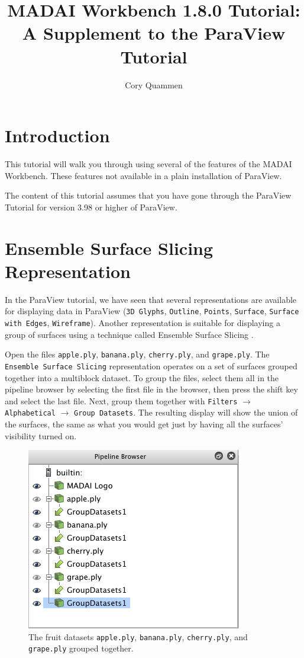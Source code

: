\documentclass[12pt]{article}
\title{MADAI Workbench 1.8.0 Tutorial: \\A Supplement to the ParaView Tutorial}
\author{Cory Quammen}
\date{} %
\begin{document}
\maketitle

\section{Introduction}

This tutorial will walk you through using several of the features of the MADAI Workbench. These features not available in a plain installation of ParaView.

The content of this tutorial assumes that you have gone through the ParaView Tutorial for version 3.98 or higher of ParaView.

\section{Ensemble Surface Slicing Representation}

In the ParaView tutorial, we have seen that several representations are available for displaying data in ParaView (\texttt{3D Glyphs}, \texttt{Outline}, \texttt{Points}, \texttt{Surface}, \texttt{Surface with Edges}, \texttt{Wireframe}). Another representation is suitable for displaying a group of surfaces using a technique called Ensemble Surface Slicing \cite{Oluwafemi2012}.

Open the files \texttt{apple.ply}, \texttt{banana.ply}, \texttt{cherry.ply}, and \texttt{grape.ply}. The \texttt{Ensemble Surface Slicing} representation operates on a set of surfaces grouped together into a multiblock dataset. To group the files, select them all in the pipeline browser by selecting the first file in the browser, then press the shift key and select the last file. Next, group them together with \texttt{Filters} $\rightarrow$ \texttt{Alphabetical} $\rightarrow$ \texttt{Group Datasets}. The resulting display will show the union of the surfaces, the same as what you would get just by having all the surfaces' visibility turned on.

\begin{figure}[htbp]
   \centering
   \includegraphics[scale=.5]{images/ESSGroupDatasets.png} %
   \caption{The fruit datasets \texttt{apple.ply}, \texttt{banana.ply}, \texttt{cherry.ply}, and \texttt{grape.ply} grouped together.}
   \label{fig:ESSGroupDatasets}
\end{figure}
\end{document}
